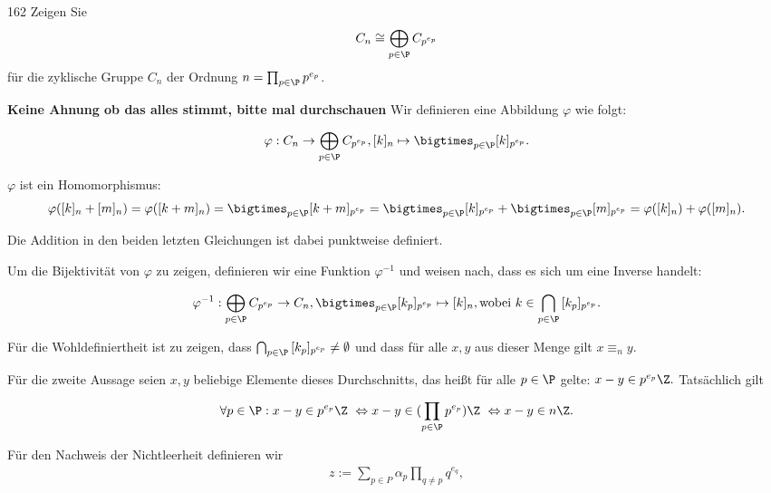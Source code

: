 \begin{algebraUE}{162}
Zeigen Sie
\begin{align*}
  C_n \cong \bigoplus_{p \in \P} C_{p^{e_p}}
\end{align*}
für die zyklische Gruppe $C_n$ der Ordnung $n = \prod_{p \in \P}p^{e_p}$.
\end{algebraUE}
\begin{solution}
\textbf{Keine Ahnung ob das alles stimmt, bitte mal durchschauen}
Wir definieren eine Abbildung $\varphi$ wie folgt:

\begin{align}
    \varphi: C_n \rightarrow \bigoplus_{p \in \P} C_{p^{e_p}}, [k]_n \mapsto \bigtimes_{p \in \P} [k]_{p^{e_p}}.
\end{align}

$\varphi$ ist ein Homomorphismus:
\begin{align}
    \varphi([k]_n + [m]_n) = \varphi([k+m]_n) = \bigtimes_{p \in \P} [k+m]_{p^{e_p}} =
    \bigtimes_{p \in \P} [k]_{p^{e_p}} +
    \bigtimes_{p \in \P} [m]_{p^{e_p}} =
    \varphi([k]_n) + \varphi([m]_n).
\end{align}

Die Addition in den beiden letzten Gleichungen ist dabei punktweise definiert.

Um die Bijektivität von $\varphi$ zu zeigen, definieren wir eine Funktion $\varphi^{-1}$ und weisen nach, dass es sich um eine Inverse handelt:

\begin{align}
   \varphi^{-1}: \bigoplus_{p \in \P} C_{p^{e_p}} \rightarrow C_n, \bigtimes_{p \in \P} [k_p]_{p^{e_p}} \mapsto [k]_n, \text{wobei~} k \in \bigcap_{p \in \P}{[k_p]_{p^{e_p}}}.
\end{align}

Für die Wohldefiniertheit ist zu zeigen, dass $\bigcap_{p \in \P}{[k_p]_{p^{e_p}}} \neq \emptyset$ und dass für alle $x, y$ aus dieser Menge gilt $x \equiv_n y$.

Für die zweite Aussage seien $x, y$ beliebige Elemente dieses Durchschnitts, das heißt für alle $p \in \P$ gelte: $x-y \in p^{e_p} \Z.$ Tatsächlich gilt

\begin{align}
   \forall p \in \P: x-y \in p^{e_p} \Z ~\Leftrightarrow x-y \in (\prod_{p \in \P} p^{e_p}) \Z ~\Leftrightarrow x-y \in n\Z.
\end{align}

Für den Nachweis der Nichtleerheit definieren wir
\begin{align}
z := \sum_{p \in P} \alpha_p \prod_{q \neq p} q^{e_q},
\end{align}


\end{solution}
